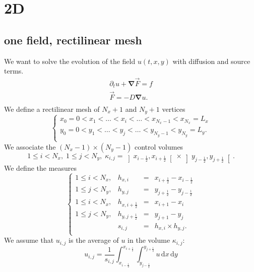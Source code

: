 \documentclass[aps,onecolumn]{revtex4}
\newcommand{\half}{\frac{1}{2}}
\newcommand{\myd}{\,\text{d}}
\begin{document}
\section{2D}
\subsection{one field, rectilinear mesh}
We want to solve the evolution of the field $u(t,x,y)$ with diffusion and source terms.
\begin{equation}
	\begin{array}{l}
		\partial_t u + {\bm \nabla} \vec{F} = f\\
		\vec{F} = -D {\bm \nabla} u.\\
	\end{array}
\end{equation}
We define a rectilinear mesh of $N_x+1$ and $N_y+1$ vertices
\begin{equation}
\left\lbrace
\begin{array}{l}
x_0=0<x_1<\ldots<x_i<\ldots<x_{N_x-1}<x_{N_x}=L_x\\
y_0=0<y_1<\ldots<y_j<\ldots<y_{N_y-1}<y_{N_y}=L_y.\\
\end{array}
\right.
\end{equation}
We associate the $(N_x-1)\times(N_y-1)$ control volumes
\begin{equation}
	1\leq i < N_x,\;1\leq j < N_y,\; \kappa_{i,j} =  \left\rbrack x_{i-\half}, x_{i+\half}\right\lbrack \times \left\rbrack y_{j-\half}, y_{j+\half}\right\lbrack.
\end{equation}
We define the measures
\begin{equation}
	\left\lbrace
	\begin{array}{llcl}
		1\leq i < N_x, &  h_{x,i} & = &x_{i+\half} - x_{i-\half}\\
		1\leq j < N_y, &  h_{y,j} & = &y_{j+\half} - y_{j-\half} \\
		1\leq i < N_x, &  h_{x,i+\half} & = & x_{i+1} - x_{i}\\
		1\leq j < N_y, &  h_{y,j+\half} & = & y_{j+1} - y_{j} \\
		& s_{i,j} & = &  h_{x,i} \times h_{y,j}.\\
	\end{array}
	\right.
\end{equation}
We assume that $u_{i,j}$ is the average of $u$ in the volume $\kappa_{i,j}$:
\begin{equation}
	u_{i,j} = \dfrac{1}{s_{i,j}} \int_{x_{i-\half}}^{x_{i+\half}} \int_{y_{j-\half}}^{y_{j+\half}} u \myd x \myd y
\end{equation}
\end{document}
